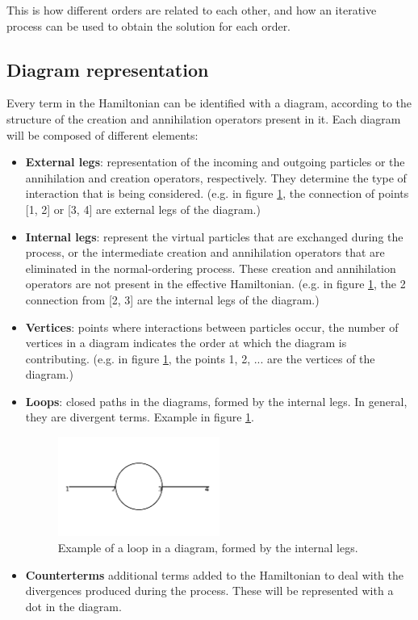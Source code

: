 \documentclass[11pt,a4paper,twoside,pdf]{article}
\numberwithin{equation}{section}
\begin{document}
This is how different orders are related to each other, and how an iterative 
process can be used to obtain the solution for each order.


\subsection{Diagram representation}

Every term in the Hamiltonian can be identified with a diagram, according to the 
structure of the creation and annihilation operators present in it. Each diagram 
will be composed of different elements:

\begin{itemize}
    \item \textbf{External legs}: representation of the incoming and outgoing particles or 
    the annihilation and creation operators, respectively. They determine the type 
    of interaction that is being considered. (e.g. in figure \ref{fig:loop_example},
    the connection of points [1, 2] or [3, 4] are external legs of the diagram.)
    \item \textbf{Internal legs}: represent the virtual particles that are exchanged during the
    process, or the intermediate creation and annihilation operators that are 
    eliminated in the normal-ordering process. These creation and annihilation operators
    are not present in the effective Hamiltonian. (e.g. in figure \ref{fig:loop_example},
    the 2 connection from [2, 3] are the internal legs of the diagram.)
    \item \textbf{Vertices}: points where interactions between particles occur, the number of
    vertices in a diagram indicates the order at which the diagram is contributing. 
    (e.g. in figure \ref{fig:loop_example}, the points 1, 2, ... are the vertices
    of the diagram.)
    \item \textbf{Loops}: closed paths in the diagrams, formed by the internal legs. In 
    general, they are divergent terms. Example in figure \ref{fig:loop_example}.
    \begin{figure}[h!]
        \centering
        \includegraphics[width=0.5\textwidth]{plots/order2/from_order1/3.png}
        \caption{Example of a loop in a diagram, formed by the internal legs.}
        \label{fig:loop_example}
    \end{figure}
    \item \textbf{Counterterms} additional terms added to the Hamiltonian to deal with the divergences
    produced during the process. These will be represented with a dot in the diagram.
\end{itemize}
\end{document}
